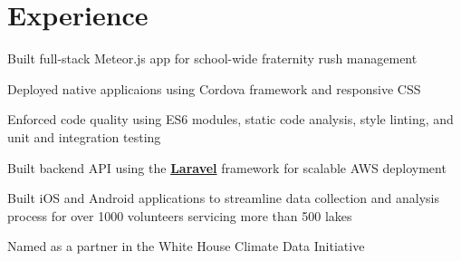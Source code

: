 \documentclass[letterpaper]{deedy-resume} %
\begin{document}
\begin{minipage}[t]{0.66\textwidth} %


\section{Experience}


\vspace{\topsep} %
\begin{tightitemize}
  \item Built full-stack Meteor.js app for school-wide fraternity rush management
  \item Deployed native applicaions using Cordova framework and responsive CSS
  \item Enforced code quality using ES6 modules, static code analysis, style linting, and unit and integration testing
\end{tightitemize}

\sectionspace %



\begin{tightitemize}
  \item Built backend API using the \textbf{\href{https://laravel.com/}{Laravel}} framework for scalable AWS deployment
  \item Built iOS and Android applications to streamline data collection and analysis process for over 1000 volunteers servicing more than 500 lakes
  \item Named as a partner in the White House Climate Data Initiative
\end{tightitemize}

\sectionspace %


\end{minipage}
\end{document}
